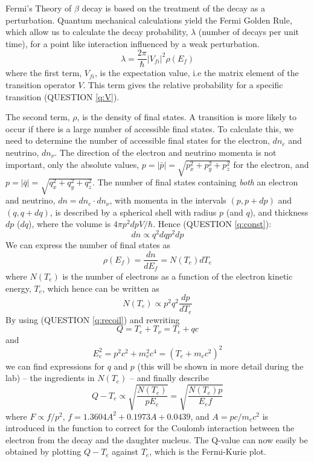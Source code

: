 \documentclass[a4,11pt, notitlepage]{article}
\begin{document}
Fermi's Theory of $\beta$ decay is based on the treatment of the decay as a perturbation. Quantum mechanical calculations yield the Fermi Golden Rule, which allow us to calculate the decay probability, $\lambda$ (number of decays per unit time), for a point like interaction influenced by a weak perturbation. 
\begin{equation}
\lambda = \frac{2\pi}{\hbar}|V_{fi}|^2 \rho(E_{f})
\end{equation}
where the first term, $V_{fi}$, is the expectation value, i.e the matrix element of the transition operator $V$. This term gives the relative probability for a specific transition (QUESTION \ref{q:V}).

The second term, $\rho$, is the density of final states. A transition is more likely to occur if there is a large number of accessible final states. To calculate this, we need to determine the number of accessible final states for the electron, $dn_e$ and neutrino, $dn_{\nu}$. The direction of the electron and neutrino momenta is not important, only the absolute values, $p=|\bar p| = \sqrt{p_x^2+p_y^2+p_z^2}$ for the electron, and $p=|\bar q| = \sqrt{q_x^2+q_y^2+q_z^2}$. The number of final states containing \textit{both} an electron and neutrino, $dn = dn_e\cdot dn_{\nu}$, with momenta in the intervals $(p, p+dp)$ and $(q, q+dq)$, is described by a spherical shell with radius $p$ (and $q$), and thickness $dp$ ($dq$), where the volume is $4\pi p^2 dpV/\hbar$. Hence (QUESTION \ref{q:const}): 
\begin{equation}
dn\propto q^2 dq p^2 dp 
\end{equation} 
We can express the number of final states as 
\begin{equation}
\rho(E_f)=\frac{dn}{dE_f}=N(T_e)dT_e
\end{equation}
where $N(T_e)$ is the number of electrons as a function of the electron kinetic energy, $T_e$, which hence can be written as 
\begin{equation}
N(T_e)\propto p^2q^2\frac{dp}{dT_e} 
\end{equation}
By using (QUESTION \ref{q:recoil}) and rewriting 
\begin{equation}
Q=T_e + T_{\nu} = T_e + qc
\end{equation} 
and
\begin{equation}
E_e^2 = p^2c^2+m_e^2c^4=(T_e+m_ec^2)^2
\end{equation} 
we can find expressions for $q$ and $p$ (this will be shown in more detail during the lab) -- the ingredients in $N(T_e)$ -- and finally describe 
\begin{equation}
Q-T_e \propto \sqrt{\frac{N(T_e)}{pE_e}} = \sqrt{\frac{N(T_e)p}{E_ef}}
\label{eq:f}
\end{equation}
where $F\propto f/p^2$, $f=1.3604A^2+0.1973A+0.0439$, and $A=pc/m_ec^2$ is introduced in the function to correct for the Coulomb interaction between the electron from the decay and the daughter nucleus. 
The Q-value can now easily be obtained by plotting $Q-T_e$ against $T_e$, which is the Fermi-Kurie plot.
\end{document}
